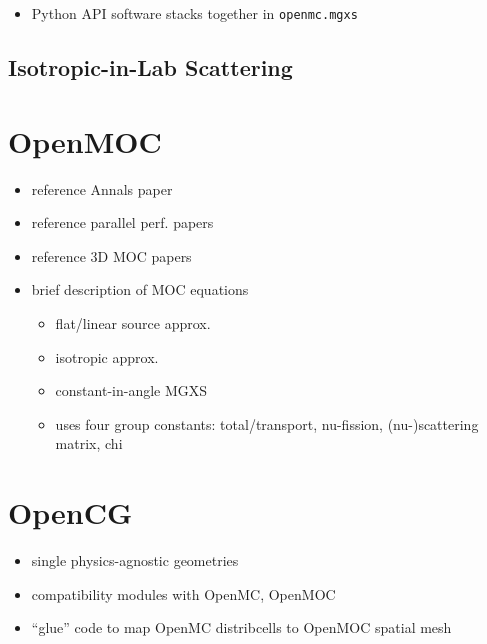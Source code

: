 \begin{itemize}
  \item Python \ac{API} software stacks together in \texttt{openmc.mgxs}
\end{itemize}

\subsection{Isotropic-in-Lab Scattering}
\label{sec:chap3-iso-in-lab}


\section{OpenMOC}
\label{sec:chap3-openmoc}

\begin{itemize}
  \item reference Annals paper
  \item reference parallel perf. papers
  \item reference 3D \ac{MOC} papers
  \item brief description of \ac{MOC} equations
  \begin{itemize}
    \item flat/linear source approx.
    \item isotropic approx.
    \item constant-in-angle \ac{MGXS}
    \item uses four group constants: total/transport, nu-fission, (nu-)scattering matrix, chi
  \end{itemize}
\end{itemize}


\section{OpenCG}
\label{sec:chap3-opencg}

\begin{itemize}
  \item single physics-agnostic geometries
  \item compatibility modules with OpenMC, OpenMOC
  \item ``glue'' code to map OpenMC distribcells to OpenMOC spatial mesh
\end{itemize}

